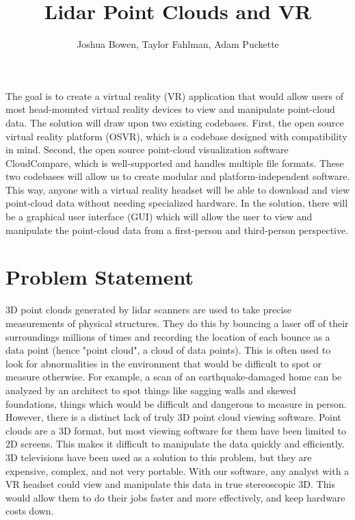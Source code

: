 \documentclass{article}
\begin{document}
\title{Lidar Point Clouds and VR}
\author{Joshua Bowen, Taylor Fahlman, Adam Puckette}

\maketitle

\abstract

The goal is to create a virtual reality (VR) application that would allow users of most head-mounted virtual reality devices to view and manipulate point-cloud data. The solution will draw upon two existing codebases. First, the open source virtual reality platform (OSVR), which is a codebase designed with compatibility in mind. Second, the open source point-cloud visualization software CloudCompare, which is well-supported and handles multiple file formats. These two codebases will allow us to create modular and platform-independent software. This way, anyone with a virtual reality headset will be able to download and view point-cloud data without needing specialized hardware. In the solution, there will be a graphical user interface (GUI) which will allow the user to view and manipulate the point-cloud data from a first-person and third-person perspective. 

\newpage
\thispagestyle{empty}
\mbox{}
\section*{Problem Statement}

3D point clouds generated by lidar scanners are used to take precise measurements of physical structures. They do this by bouncing a laser off of their surroundings millions of times and recording the location of each bounce as a data point (hence "point cloud", a cloud of data points). This is often used to look for abnormalities in the environment that would be difficult to spot or measure otherwise. For example, a scan of an earthquake-damaged home can be analyzed by an architect to spot things like sagging walls and skewed foundations, things which would be difficult and dangerous to measure in person. However, there is a distinct lack of truly 3D point cloud viewing software. Point clouds are a 3D format, but most viewing software for them have been limited to 2D screens. This makes it difficult to manipulate the data quickly and efficiently. 3D televisions have been used as a solution to this problem, but they are expensive, complex, and not very portable. With our software, any analyst with a VR headset could view and manipulate this data in true stereoscopic 3D. This would allow them to do their jobs faster and more effectively, and keep hardware costs down. 
\end{document}
